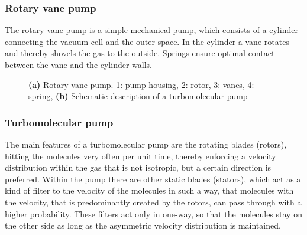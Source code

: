 \documentclass[a4paper]{scrartcl}
\numberwithin{equation}{section}
\numberwithin{figure}{section}
\numberwithin{table}{section}
\begin{document}
\subsubsection*{Rotary vane pump}
The rotary vane pump is a simple mechanical pump, which consists of a cylinder connecting the vacuum cell and the outer space. In the cylinder a vane rotates and thereby shovels the gas to the outside. Springs ensure optimal contact between the vane and the cylinder walls. 
\begin{figure} 
 \centering
{}
 \hfill
{}
\caption{
\small \textbf{(a)} Rotary vane pump. 1: pump housing, 2: rotor, 3: vanes, 4: spring,  \textbf{(b)} Schematic description of a turbomolecular pump } 
	\label{fig:pump}
\end{figure}


\subsubsection*{Turbomolecular pump}
The main features of a turbomolecular pump are the rotating blades (rotors), hitting the molecules very often per unit time, thereby enforcing a velocity distribution within the gas that is not isotropic, but a certain direction is preferred. Within the pump there are other static blades (stators), which act as a kind of filter to the velocity of the molecules in such a way, that molecules with the velocity, that is predominantly created by the rotors, can pass through with a higher probability. These filters act only in one-way, so that the molecules stay on the other side as long as the asymmetric velocity distribution is maintained. 
\end{document}
